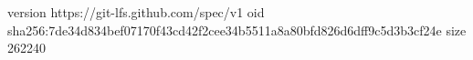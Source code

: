 version https://git-lfs.github.com/spec/v1
oid sha256:7de34d834bef07170f43cd42f2cee34b5511a8a80bfd826d6dff9c5d3b3cf24e
size 262240
